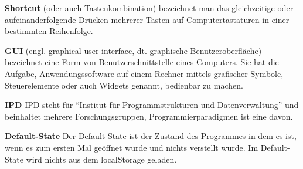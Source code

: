 \documentclass[parskip=full,11pt,twoside]{scrartcl}
\begin{document}
\textbf{Shortcut}
\newline
(oder auch Tastenkombination) bezeichnet man das gleichzeitige oder aufeinanderfolgende Drücken mehrerer Tasten auf Computertastaturen in einer bestimmten Reihenfolge.

\textbf{GUI}
\newline
(engl. graphical user interface, dt. graphische Benutzeroberfläche) bezeichnet eine Form von Benutzerschnittstelle eines Computers. Sie hat die Aufgabe, Anwendungssoftware auf einem Rechner mittels grafischer Symbole, Steuerelemente oder auch Widgets genannt, bedienbar zu machen.

\textbf{IPD}
\newline
IPD steht für \enquote{Institut für Programmstrukturen und Datenverwaltung} und beinhaltet mehrere Forschungsgruppen, Programmierparadigmen ist eine davon.

\textbf{Default-State}
\newline
Der Default-State ist der Zustand des Programmes in dem es ist, wenn es zum ersten Mal geöffnet wurde und nichts verstellt wurde. Im Default-State wird nichts aus dem localStorage geladen.
\end{document}
